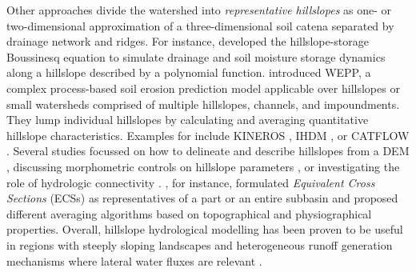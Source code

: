 Other approaches divide the watershed into \emph{representative hillslopes} as one- or two-dimensional approximation of a three-dimensional soil catena separated by drainage network and ridges.
For instance, \citet{Troch2003} developed the hillslope-storage Boussinesq \DIFaddbegin {}\DIFaddend equation to simulate drainage and soil moisture storage dynamics along a hillslope described by a polynomial function.
\DIFaddbegin {}\DIFaddend \citet{Flanagan1995} introduced WEPP, a complex process-based soil erosion prediction model applicable over hillslopes or small watersheds comprised of multiple hillslopes, channels, and impoundments.
They lump individual hillslopes by calculating and averaging quantitative hillslope characteristics.
Examples for \DIFdelbegin {}\DIFdelend \DIFaddbegin {}\DIFaddend include KINEROS \citep{Woolhiser1990}, IHDM \citep{Beven1987}, \DIFaddbegin {}\DIFaddend or CATFLOW \citep{Maurer1997}.
Several studies focussed on how to delineate and describe hillslopes from a DEM \citep[e.g.,][]{Cochrane2003, Noel2014}, discussing morphometric controls on hillslope parameters \citep{Bogaart2006}, or investigating the role of hydrologic connectivity \citep{Smith2013}.
\citet{Khan2014}, for instance, formulated \emph{Equivalent Cross Sections} (ECSs) as representatives of a part or an entire subbasin and proposed different averaging algorithms based on topographical and physiographical properties.
\DIFaddbegin {}\emph{} \DIFaddend Overall, hillslope hydrological modelling has been proven to be useful in regions with steeply sloping landscapes and heterogeneous runoff generation mechanisms where lateral water fluxes are relevant \citep{Bronstert1999}.
\DIFaddbegin {}\DIFaddend 

